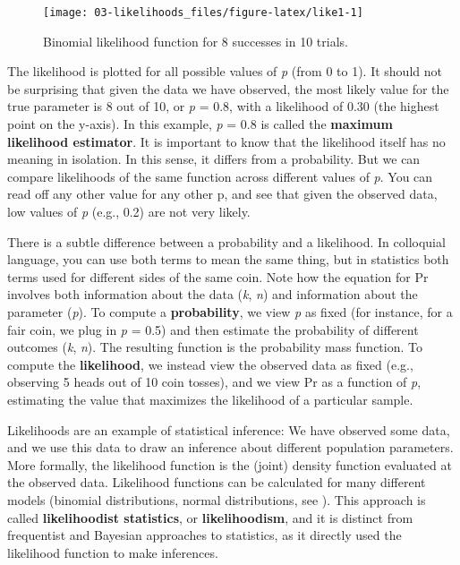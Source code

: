 \documentclass[
  oneside]{krantz}
\begin{document}
\begin{figure}

{\centering \texttt{[image: 03-likelihoods\_files/figure-latex/like1-1]} 

}

\caption{Binomial likelihood function for 8 successes in 10 trials.}\label{fig:like1}
\end{figure}

The likelihood is plotted for all possible values of \emph{p} (from 0 to 1). It should not be surprising that given the data we have observed, the most likely value for the true parameter is 8 out of 10, or \emph{p} = 0.8, with a likelihood of 0.30 (the highest point on the y-axis). In this example, \emph{p} = 0.8 is called the \textbf{maximum likelihood estimator}. It is important to know that the likelihood itself has no meaning in isolation. In this sense, it differs from a probability. But we can compare likelihoods of the same function across different values of \emph{p}. You can read off any other value for any other p, and see that given the observed data, low values of \emph{p} (e.g., 0.2) are not very likely.

There is a subtle difference between a probability and a likelihood. In colloquial language, you can use both terms to mean the same thing, but in statistics both terms used for different sides of the same coin. Note how the equation for Pr involves both information about the data (\emph{k}, \emph{n}) and information about the parameter (\emph{p}). To compute a \textbf{probability}, we view \emph{p} as fixed (for instance, for a fair coin, we plug in \emph{p} = 0.5) and then estimate the probability of different outcomes (\emph{k}, \emph{n}). The resulting function is the probability mass function. To compute the \textbf{likelihood}, we instead view the observed data as fixed (e.g., observing 5 heads out of 10 coin tosses), and we view Pr as a function of \emph{p}, estimating the value that maximizes the likelihood of a particular sample.

Likelihoods are an example of statistical inference: We have observed some data, and we use this data to draw an inference about different population parameters. More formally, the likelihood function is the (joint) density function evaluated at the observed data. Likelihood functions can be calculated for many different models (binomial distributions, normal distributions, see \citet{millar_maximum_2011}). This approach is called \textbf{likelihoodist statistics}, or \textbf{likelihoodism}, and it is distinct from frequentist and Bayesian approaches to statistics, as it directly used the likelihood function to make inferences.
\end{document}
